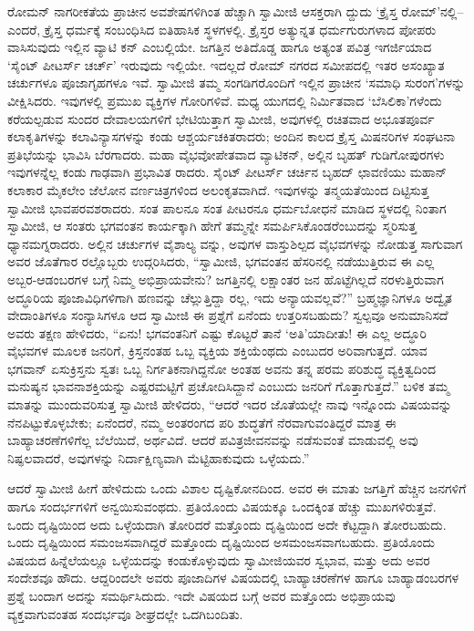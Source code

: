 ರೋಮನ್ ನಾಗರೀಕತೆಯ ಪ್ರಾಚೀನ ಅವಶೇಷಗಳಿಗಿಂತ ಹೆಚ್ಚಾಗಿ ಸ್ವಾಮೀಜಿ ಆಸಕ್ತರಾಗಿ ದ್ದುದು ‘ಕ್ರೈಸ್ತ ರೋಮ್​’ನಲ್ಲಿ–ಎಂದರೆ, ಕ್ರೈಸ್ತ ಧರ್ಮಕ್ಕೆ ಸಂಬಂಧಿಸಿದ ಐತಿಹಾಸಿಕ ಸ್ಥಳಗಳಲ್ಲಿ. ಕ್ರೈಸ್ತರ ಅತ್ಯುನ್ನತ ಧರ್ಮಗುರುಗಳಾದ ಪೋಪರು ವಾಸಿಸುವುದು ಇಲ್ಲಿನ ವ್ಯಾಟಿ ಕನ್ ಎಂಬಲ್ಲಿಯೇ. ಜಗತ್ತಿನ ಅತಿದೊಡ್ಡ ಹಾಗೂ ಅತ್ಯಂತ ಪವಿತ್ರ ಇಗರ್ಜಿಯಾದ ‘ಸೈಂಟ್ ಪೀಟರ್ಸ್ ಚರ್ಚ್​’ ಇರುವುದು ಇಲ್ಲಿಯೇ. ಇದಲ್ಲದೆ ರೋಮ್ ನಗರದ ಸಮೀಪದಲ್ಲಿ ಇತರ ಅಸಂಖ್ಯಾತ ಚರ್ಚುಗಳೂ ಪೂಜಾಗೃಹಗಳೂ ಇವೆ. ಸ್ವಾಮೀಜಿ ತಮ್ಮ ಸಂಗಡಿಗರೊಂದಿಗೆ ಇಲ್ಲಿನ ಪ್ರಾಚೀನ ‘ಸಮಾಧಿ ಸುರಂಗ’ಗಳನ್ನು ವೀಕ್ಷಿಸಿದರು. ಇವುಗಳಲ್ಲಿ ಪ್ರಮುಖ ವ್ಯಕ್ತಿಗಳ ಗೋರಿಗಳಿವೆ. ಮಧ್ಯ ಯುಗದಲ್ಲಿ ನಿರ್ಮಿತವಾದ ‘ಬೆಸಿಲಿಕಾ’ಗಳೆಂದು ಕರೆಯಲ್ಪಡುವ ಸುಂದರ ದೇವಾಲಯಗಳಿಗೆ ಭೇಟಿಯಿತ್ತಾಗ ಸ್ವಾಮೀಜಿ, ಅವುಗಳಲ್ಲಿ ರಚಿತವಾದ ಅಭೂತಪೂರ್ವ ಕಲಾಕೃತಿಗಳನ್ನು ಕಲಾವಿನ್ಯಾಸಗಳನ್ನು ಕಂಡು ಆಶ್ಚರ್ಯಚಕಿತರಾದರು; ಅಂದಿನ ಕಾಲದ ಕ್ರೈಸ್ತ ಮಿಷನರಿಗಳ ಸಂಘಟನಾ ಪ್ರತಿಭೆಯನ್ನು ಭಾವಿಸಿ ಬೆರಗಾದರು. ಮಹಾ ವೈಭವೋಪೇತವಾದ ವ್ಯಾಟಿಕನ್, ಅಲ್ಲಿನ ಬೃಹತ್ ಗುಡಿಗೋಪುರಗಳು ಇವುಗಳನ್ನೆಲ್ಲ ಕಂಡು ಗಾಢವಾಗಿ ಪ್ರಭಾವಿತ ರಾದರು. ಸೈಂಟ್ ಪೀಟರ್ಸ್ ಚರ್ಚಿನ ಬೃಹದ್ ಛಾವಣಿಯು ಮಹಾನ್ ಕಲಾಕಾರ ಮೈಕಲೇಂ ಜೆಲೋನ ವರ್ಣಚಿತ್ರಗಳಿಂದ ಅಲಂಕೃತವಾಗಿದೆ. ಇವುಗಳನ್ನು ತನ್ಮಯತೆಯಿಂದ ದಿಟ್ಟಿಸುತ್ತ ಸ್ವಾಮೀಜಿ ಭಾವಪರವಶರಾದರು. ಸಂತ ಪಾಲನೂ ಸಂತ ಪೀಟರನೂ ಧರ್ಮಬೋಧನೆ ಮಾಡಿದ ಸ್ಥಳದಲ್ಲಿ ನಿಂತಾಗ ಸ್ವಾಮೀಜಿ, ಆ ಸಂತರು ಭಗವಂತನ ಕಾರ್ಯಕ್ಕಾಗಿ ಹೇಗೆ ತಮ್ಮನ್ನೇ ಸಮರ್ಪಿಸಿಕೊಂಡರೆಂಬುದನ್ನು ಸ್ಮರಿಸುತ್ತ ಧ್ಯಾನಮಗ್ನರಾದರು. ಅಲ್ಲಿನ ಚರ್ಚುಗಳ ವೈಶಾಲ್ಯ ವನ್ನು, ಅವುಗಳ ವಾಸ್ತುಶಿಲ್ಪದ ವೈಭವಗಳನ್ನು ನೋಡುತ್ತ ಸಾಗುವಾಗ ಅವರ ಜೊತೆಗಾರ ರಲ್ಲೊಬ್ಬರು ಉದ್ಗರಿಸಿದರು, “ಸ್ವಾಮೀಜಿ, ಭಗವಂತನ ಹೆಸರಿನಲ್ಲಿ ನಡೆಯುತ್ತಿರುವ ಈ ಎಲ್ಲ ಅಬ್ಬರ-ಆಡಂಬರಗಳ ಬಗ್ಗೆ ನಿಮ್ಮ ಅಭಿಪ್ರಾಯವೇನು? ಜಗತ್ತಿನಲ್ಲಿ ಲಕ್ಷಾಂತರ ಜನ ಹೊಟ್ಟೆಗಿಲ್ಲದೆ ನರಳುತ್ತಿರುವಾಗ ಅದ್ಧೂರಿಯ ಪೂಜಾವಿಧಿಗಳಿಗಾಗಿ ಹಣವನ್ನು ಚೆಲ್ಲುತ್ತಿದ್ದಾ ರಲ್ಲ, ಇದು ಅನ್ಯಾಯವಲ್ಲವೆ?” ಬ್ರಹ್ಮಜ್ಞಾನಿಗಳೂ ಅದ್ವೈತ ವೇದಾಂತಿಗಳೂ ಸಂನ್ಯಾಸಿಗಳೂ ಆದ ಸ್ವಾಮೀಜಿ ಈ ಪ್ರಶ್ನೆಗೆ ಏನೆಂದು ಉತ್ತರಿಸಬಹುದು? ಸ್ವಲ್ಪವೂ ಅನುಮಾನಿಸದೆ ಅವರು ತಕ್ಷಣ ಹೇಳಿದರು, “ಏನು! ಭಗವಂತನಿಗೆ ಎಷ್ಟು ಕೊಟ್ಟರೆ ತಾನೆ ‘ಅತಿ’ಯಾದೀತು! ಈ ಎಲ್ಲ ಅದ್ಧೂರಿ ವೈಭವಗಳ ಮೂಲಕ ಜನರಿಗೆ, ಕ್ರಿಸ್ತನಂತಹ ಒಬ್ಬ ವ್ಯಕ್ತಿಯ ಶಕ್ತಿಯೆಂಥದು ಎಂಬುದರ ಅರಿವಾಗುತ್ತದೆ. ಯಾವ ಭಗವಾನ್ ಏಸುಕ್ರಿಸ್ತನು ಸ್ವತಃ ಒಬ್ಬ ನಿರ್ಗತಿಕನಾಗಿದ್ದನೋ ಅಂತಹ ಅವನು ತನ್ನ ಪರಮ ಪರಿಶುದ್ಧ ವ್ಯಕ್ತಿತ್ವದಿಂದ ಮನುಷ್ಯನ ಭಾವನಾಶಕ್ತಿಯನ್ನು ಎಷ್ಟರಮಟ್ಟಿಗೆ ಪ್ರಚೋದಿಸಿದ್ದಾನೆ ಎಂಬುದು ಜನರಿಗೆ ಗೊತ್ತಾಗುತ್ತದೆ.” ಬಳಿಕ ತಮ್ಮ ಮಾತನ್ನು ಮುಂದುವರಿಸುತ್ತ ಸ್ವಾಮೀಜಿ ಹೇಳಿದರು, “ಆದರೆ ಇದರ ಜೊತೆಯಲ್ಲೇ ನಾವು ಇನ್ನೊಂದು ವಿಷಯವನ್ನು ನೆನಪಿಟ್ಟುಕೊಳ್ಳಬೇಕು; ಏನೆಂದರೆ, ನಮ್ಮ ಅಂತರಂಗದ ಪರಿ ಶುದ್ಧತೆಗೆ ನೆರವಾಗುವಂತಿದ್ದರೆ ಮಾತ್ರ ಈ ಬಾಹ್ಯಾಚರಣೆಗಳಿಗೆಲ್ಲ ಬೆಲೆಯಿದೆ, ಅರ್ಥವಿದೆ. ಆದರೆ ಪವಿತ್ರಜೀವನವನ್ನು ನಡೆಸುವಂತೆ ಮಾಡುವಲ್ಲಿ ಅವು ನಿಷ್ಫಲವಾದರೆ, ಅವುಗಳನ್ನು ನಿರ್ದಾಕ್ಷಿಣ್ಯವಾಗಿ ಮೆಟ್ಟಿಹಾಕುವುದು ಒಳ್ಳೆಯದು.”

ಆದರೆ ಸ್ವಾಮೀಜಿ ಹೀಗೆ ಹೇಳಿದುದು ಒಂದು ವಿಶಾಲ ದೃಷ್ಟಿಕೋನದಿಂದ. ಅವರ ಈ ಮಾತು ಜಗತ್ತಿಗೆ ಹೆಚ್ಚಿನ ಜನಗಳಿಗೆ ಹಾಗೂ ಸಂದರ್ಭಗಳಿಗೆ ಅನ್ವಯಿಸುವಂಥದು. ಪ್ರತಿಯೊಂದು ವಿಷಯಕ್ಕೂ ಒಂದಕ್ಕಿಂತ ಹೆಚ್ಚು ಮುಖಗಳಿರುತ್ತವೆ. ಒಂದು ದೃಷ್ಟಿಯಿಂದ ಅದು ಒಳ್ಳೆಯದಾಗಿ ತೋರಿದರೆ ಮತ್ತೊಂದು ದೃಷ್ಟಿಯಿಂದ ಅದೇ ಕೆಟ್ಟದ್ದಾಗಿ ತೋರಬಹುದು. ಒಂದು ದೃಷ್ಟಿಯಿಂದ ಸಮಂಜಸವಾಗಿದ್ದರೆ ಮತ್ತೊಂದು ದೃಷ್ಟಿಯಿಂದ ಅಸಮಂಜಸವಾಗಬಹುದು. ಪ್ರತಿಯೊಂದು ವಿಷಯದ ಹಿನ್ನೆಲೆಯಲ್ಲೂ ಒಳ್ಳೆಯದನ್ನು ಕಂಡುಕೊಳ್ಳುವುದು ಸ್ವಾಮೀಜಿಯವರ ಸ್ವಭಾವ, ಮತ್ತು ಅದು ಅವರ ಸಂದೇಶವೂ ಹೌದು. ಆದ್ದರಿಂದಲೇ ಅವರು ಪೂಜಾದಿಗಳ ವಿಷಯದಲ್ಲಿ ಬಾಹ್ಯಾಚರಣೆಗಳ ಹಾಗೂ ಬಾಹ್ಯಾಡಂಬರಗಳ ಪ್ರಶ್ನೆ ಬಂದಾಗ ಅದನ್ನು ಸಮರ್ಥಿಸಿದುದು. ಇದೇ ವಿಷಯದ ಬಗ್ಗೆ ಅವರ ಮತ್ತೊಂದು ಅಭಿಪ್ರಾಯವು ವ್ಯಕ್ತವಾಗುವಂತಹ ಸಂದರ್ಭವೂ ಶೀಘ್ರದಲ್ಲೇ ಒದಗಿಬಂದಿತು.

